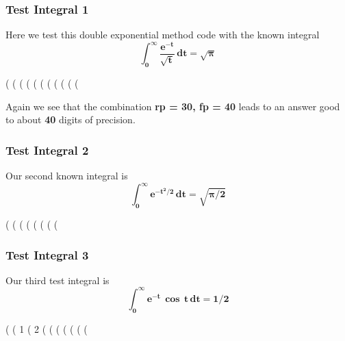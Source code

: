 \documentclass[12pt]{article}
\begin{document}
\subsubsection*{Test Integral 1}
Here we test this double exponential method code with the known
  integral
\begin{equation}
\mathbf{\int_{0}^{\infty} \frac{e^{-t}}{\sqrt{t}} \, dt = \sqrt{\boldsymbol{\pi}}}
\end{equation} 
\begin{myVerbatim}
(%
(%
(%
(%
(%
(%
(%
(%
(%
(%
(%
\end{myVerbatim} 
Again we see that the combination \textbf{rp = 30, fp = 40} leads to an
  answer good to about \textbf{40} digits of precision.
\subsubsection*{Test Integral 2}
Our second known integral is
\begin{equation}
\mathbf{\int_{0}^{\infty} e^{-t^{2}/2} \, dt = \sqrt{\boldsymbol{\pi}/2} }
\end{equation} 
\begin{myVerbatim}
(%
(%
(%
(%
(%
(%
(%
(%
\end{myVerbatim} 
\newpage
\subsubsection*{Test Integral 3}
Our third test integral is
\begin{equation}
\mathbf{\int_{0}^{\infty} e^{-t} \, \boldsymbol{\cos}\,t\,dt = 1/2 }
\end{equation} 
\begin{myVerbatim}
(%
(%
                                       1
(%
                                       2
(%
(%
(%
(%
(%
(%
(%
\end{myVerbatim} 
\end{document}
